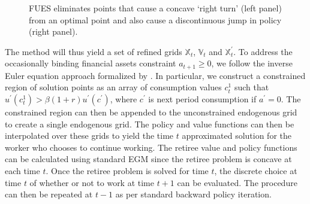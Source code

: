\documentclass[12pt]{article}
\begin{document}
\begin{figure}[H]
\begin{minipage}[t]{0.45\textwidth}
\centering
\scalebox{0.45}{}
\end{minipage}
\hspace{0.50cm}
\begin{minipage}[t]{0.45\textwidth}
\centering
\scalebox{0.45}{}
\end{minipage}
\begin{center}
\smallskip
\hspace{-1.5cm}
\end{center}

\caption{FUES eliminates points that cause a concave `right turn' (left panel) from an optimal point and also cause a discontinuous jump in policy (right panel).}
\label{fig: FUES_1}
\end{figure}
%
The method will thus yield a set of refined grids $\mathbb{X}_{t}$, $\mathbb{V}_{t}$ and $\mathbb{X}_{t}^{\prime}$. To address the occasionally binding financial assets constraint $a_{t+1}\geq 0$, we follow the inverse Euler equation approach formalized by \cite{DS2024RFC}. In particular, we construct a constrained region of solution points as an array of consumption values $c_{t}^{1}$ such that $u^{\prime}(c_{t}^{1})> \beta(1+r)u^{\prime}(c^{\prime})$, where $c^{\prime}$ is next period consumption if $a^{\prime}=0$. The constrained region can then be appended to the unconstrained endogenous grid to create a single endogenous grid. The policy and value functions can then be interpolated over these grids to yield the time $t$ approximated solution for the worker who chooses to continue working. The retiree value and policy functions can be calculated using standard EGM since the retiree problem is concave at each time $t$. Once the retiree problem is solved for time $t$, the discrete choice at time $t$ of whether or not to work at time $t+1$ can be evaluated. The procedure can then be repeated at $t-1$ as per standard backward policy iteration. 


\end{document}
